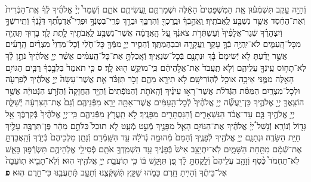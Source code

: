 \documentclass[twoside, openany, parskip=half, 11pt]{book}
\begin{document}
\begin{sometimes}
\begin{footnotesize}
\begin{multicols}{2}
\\
וְֿהָיָ֣ה עֵ֣קֶב תִּשְׁמְֿע֗וּן אֵ֤ת הַמִּשְׁפָּטִים֙ הָאֵ֔לֶּה וּשְׁמַרְתֶּ֥ם וַֽעֲשִׂיתֶ֖ם אֹתָ֑ם וְֿשָׁמַר֩ יְיָ֨ אֱלֹהֶ֜יךָ לְֿךָ֗ אֶֽת־הַבְּֿרִית֙ וְֿאֶת־הַחֶ֔סֶד אֲשֶׁ֥ר נִשְׁבַּ֖ע לַֽאֲבֹתֶֽיךָ׃ וַֽאֲהֵ֣בְֿךָ֔ וּבֵֽרַכְךָ֖ וְֿהִרְבֶּ֑ךָ וּבֵרַ֣ךְ פְּֿרִֽי־בִטְנְֿךָ֣ וּפְרִֽי־אַ֠דְמָתֶ֠ךָ דְּֿגָ֨נְֿךָ֜ וְֿתִֽירשְֿׁךָ֣ וְֿיִצְהָרֶ֗ךָ שְֿׁגַר־אֲלָפֶ֨יךָ֙ וְֿעַשְׁתְּֿרֹ֣ת צֹאנֶ֔ךָ עַ֚ל הָֽאֲדָמָ֔ה אֲשֶׁר־נִשְׁבַּ֥ע לַֽאֲבֹתֶ֖יךָ לָ֥תֶת לָֽךְ׃ בָּר֥וּךְ תִּֽהְיֶ֖ה מִכׇּל־הָֽעַמִּ֑ים לֹא־יִֽהְיֶ֥ה בְֿךָ֛ עָקָ֥ר וַֽעֲקָרָ֖ה וּבִבְהֶמְתֶּֽךָ׃ וְֿהֵסִ֧יר יְיָ֛ מִמְּֿךָ֖ כׇּל־חֹ֑לִי וְֿכׇל־מַדְוֵי֩ מִצְרַ֨יִם הָֽרָעִ֜ים אֲשֶׁ֣ר יָדַ֗עְתָּ לֹ֤א יְֿשִׂימָם֙ בָּ֔ךְ וּנְתָנָ֖ם בְּֿכׇל־שֽׂנְאֶֽיךָ׃ וְֿאָֽכַלְתָּ֣ אֶת־כׇּל־הָֽעַמִּ֗ים אֲשֶׁ֨ר יְיָ֤ אֱלֹהֶ֨יךָ֙ נֹתֵ֣ן לָ֔ךְ לֹֽא־תָח֥וֹס עֵֽינְֿךָ֖ עֲלֵיהֶ֑ם וְֿלֹ֤א תַֽעֲבֹד֙ אֶת־אֱלֹ֣הֵיהֶ֔ם כִּֽי־מוֹקֵ֥שׁ ה֖וּא לָֽךְ׃ \textbf{ס} כִּ֤י תֹאמַר֙ בִּלְבָ֣בְֿךָ֔ רַבִּ֛ים הַגּוֹיִ֥ם הָאֵ֖לֶּה מִמֶּ֑נִּי אֵיכָ֥ה אוּכַ֖ל לְֿהֽוֹרִישָֽׁם׃ לֹ֥א תִירָ֖א מֵהֶ֑ם זָכֹ֣ר תִּזְכֹּ֗ר אֵ֤ת אֲשֶׁר־עָשָׂה֙ יְיָ֣ אֱלֹהֶ֔יךָ לְֿפַרְעֹ֖ה וּלְכׇל־מִצְרָֽיִם׃ הַמַּסֹּ֨ת הַגְּֿדֹלֹ֜ת אֲשֶׁר־רָא֣וּ עֵינֶ֗יךָ וְֿהָֽאֹתֹ֤ת וְֿהַמֹּֽפְֿתִים֙ וְֿהַיָּ֤ד הַֽחֲזָקָה֙ וְֿהַזְּֿרֹ֣עַ הַנְּֿטוּיָ֔ה אֲשֶׁ֥ר הוֹצִֽאֲךָ֖ יְיָ֣ אֱלֹהֶ֑יךָ כֵּן־יַֽעֲשֶׂ֞ה יְיָ֤ אֱלֹהֶ֨יךָ֙ לְֿכׇל־הָ֣עַמִּ֔ים אֲשֶׁר־אַתָּ֥ה יָרֵ֖א מִפְּֿנֵיהֶֽם׃ וְֿגַם֙ אֶת־הַצִּרְעָ֔ה יְֿשַׁלַּ֛ח יְיָ֥ אֱלֹהֶ֖יךָ בָּ֑ם עַד־אֲבֹ֗ד הַנִּשְׁאָרִ֛ים וְֿהַנִּסְתָּרִ֖ים מִפָּנֶֽיךָ׃ לֹ֥א תַֽעֲרֹ֖ץ מִפְּֿנֵיהֶ֑ם כִּֽי־יְיָ֤ אֱלֹהֶ֨יךָ֙ בְּֿקִרְבֶּ֔ךָ אֵ֥ל גָּד֖וֹל וְֿנוֹרָֽא׃  וְֿנָשַׁל֩ יְיָ֨ אֱלֹהֶ֜יךָ אֶת־הַגּוֹיִ֥ם הָאֵ֛ל מִפָּנֶ֖יךָ מְֿעַ֣ט מְֿעָ֑ט לֹ֤א תוּכַל֙ כַּלֹּתָ֣ם מַהֵ֔ר פֶּן־תִּרְבֶּ֥ה עָלֶ֖יךָ חַיַּ֥ת הַשָּׂדֶֽה׃ וּנְתָנָ֛ם יְיָ֥ אֱלֹהֶ֖יךָ לְֿפָנֶ֑יךָ וְֿהָמָם֙ מְֿהוּמָ֣ה גְֿדֹלָ֔ה עַ֖ד הִשָּֽׁמְֿדָֽם׃ וְֿנָתַ֤ן מַלְכֵיהֶם֙ בְּֿיָדֶ֔ךָ וְֿהַֽאֲבַדְתָּ֣ אֶת־שְֿׁמָ֔ם מִתַּ֖חַת הַשָּׁמָ֑יִם לֹֽא־יִתְיַצֵּ֥ב אִישׁ֙ בְּֿפָנֶ֔יךָ עַ֥ד הִשְׁמִֽדְךָ֖ אֹתָֽם׃ פְּֿסִילֵ֥י אֱלֹֽהֵיהֶ֖ם תִּשְׂרְֿפ֣וּן בָּאֵ֑שׁ לֹֽא־תַחְמֹד֩ כֶּ֨סֶף וְֿזָהָ֤ב עֲלֵיהֶם֙ וְֿלָֽקַחְתָּ֣ לָ֔ךְ פֶּ֚ן תִּוָּקֵ֣שׁ בּ֔וֹ כִּ֧י תֽוֹעֲבַ֛ת יְיָ֥ אֱלֹהֶ֖יךָ הֽוּא׃ וְֿלֹֽא־תָבִ֤יא תֽוֹעֵבָה֙ אֶל־בֵּיתֶ֔ךָ וְֿהָיִ֥יתָ חֵ֖רֶם כָּמֹ֑הוּ שַׁקֵּ֧ץ תְּֿשַׁקְּֿצֶ֛נּוּ וְֿתַעֵ֥ב תְּֽֿתַעֲבֶ֖נּוּ כִּי־חֵ֥רֶם הֽוּא׃ \textbf{פ}

\end{multicols}
\end{footnotesize}
\end{sometimes}
\end{document}
